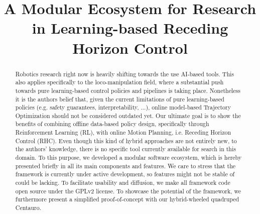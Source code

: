 \documentclass[letterpaper, 10 pt, conference]{ieeeconf}  %
\begin{document}
	
\title{\LARGE \bf
A Modular Ecosystem for Research in Learning-based Receding Horizon Control
}

\author{
}

\maketitle

\begingroup\renewcommand{}
\endgroup

\begingroup\renewcommand{}
\endgroup

\begingroup\renewcommand{}
\endgroup

\setlength{\textfloatsep}{12.0pt plus 8.0pt minus .0pt}

\begin{abstract}
Robotics research right now is heavily shifting towards the use AI-based tools. This also applies specifically to the loco-manipulation field, where a substantial push towards pure learning-based control policies and pipelines is taking place. Nonetheless it is the authors belief that, given the current limitations of pure learning-based policies (e.g. safety guarantees, interpretability, ...), online model-based Trajectory Optimization should not be considered outdated yet. Our ultimate goal is to show the benefits of combining offline data-based policy design, specifically through Reinforcement Learning (RL), with online Motion Planning, i.e. Receding Horizon Control (RHC). Even though this kind of hybrid approaches are not entirely new, to the authors' knowledge, there is no specific tool currently available for search in this domain. To this purpose, we developed a modular software ecosystem, which is hereby presented briefly in all its main components and features. We care to stress that the framework is currently under active development, so features might not be stable of could be lacking. To facilitate usability and diffusion, we make all framework code open source under the GPLv2 license. To showcase the potential of the framework, we furthermore present a simplified proof-of-concept with our hybrid-wheeled quadruped Centauro.
\end{abstract}

\IEEEpeerreviewmaketitle











\end{document}
